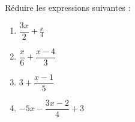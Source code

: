
\begin{exercice}\label{exo2smath-0108}

Réduire les expressions suivantes :
\begin{multicols}{2}
    \begin{enumerate}
        \item
            \( \dfrac{ 3x }{ 2 }+\frac{ x }{ 4 }\)
        \item
            \( \dfrac{ x }{ 6 }+\dfrac{ x-4 }{ 3 }\)
        \item
            \( 3+\dfrac{ x-1 }{ 5 }\)
        \item
            \( -5x-\dfrac{ 3x-2 }{ 4 }+3\)
    \end{enumerate}
\end{multicols}

\end{exercice}
